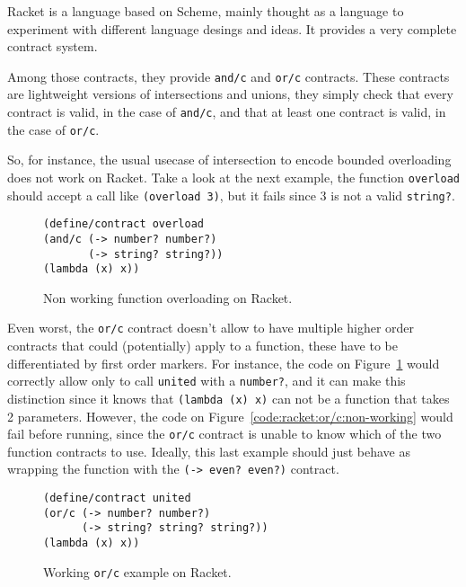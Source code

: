 \documentclass[sigplan,10pt,review,anonymous]{acmart}
\newcommand{\racket}[1]{\lstinline[language=racket]{#1}}
\begin{document}
Racket is a language based on Scheme, mainly thought as a language to experiment
with different language desings and ideas. It provides a very complete contract
system\cite{RacketContracts}.

Among those contracts, they provide \racket{and/c} and \racket{or/c} contracts.
These contracts are lightweight versions of intersections and unions, they simply
check that every contract is valid, in the case of \racket{and/c},
and that at least one contract
is valid, in the case of \racket{or/c}.

So, for instance, the usual usecase of intersection to encode bounded overloading
does not work on Racket. Take a look at the next example, the function
\racket{overload} should accept a call like \racket{(overload 3)}, but it fails
since 3 is not a valid \racket{string?}.

\begin{figure}[h]

\begin{lstlisting}[language=racket]
(define/contract overload
(and/c (-> number? number?)
       (-> string? string?))
(lambda (x) x))
\end{lstlisting}
\caption{Non working function overloading on Racket.}

\end{figure}

Even worst, the \racket{or/c} contract doesn't allow to have multiple higher order
contracts that could (potentially) apply to a function, these have to be
differentiated by first order markers.
For instance, the code on Figure~\ref{code:racket:or/c:working}
would correctly allow only to call
\racket{united} with a \racket{number?},
and it can make this distinction since it knows that
\racket{(lambda (x) x)} can not be a function that takes 2 parameters.
However, the code on Figure~\ref{code:racket:or/c:non-working} would fail
before running, since the \racket{or/c} contract is unable to know
which of the two function contracts to use.
Ideally, this last example should just behave as wrapping
the function with the \racket{(-> even? even?)} contract.

\begin{figure}[h]

\begin{lstlisting}[language=racket]
(define/contract united
(or/c (-> number? number?)
      (-> string? string? string?))
(lambda (x) x))
\end{lstlisting}
\caption{Working \racket{or/c} example on Racket.}
\label{code:racket:or/c:working}

\end{figure}
\end{document}
